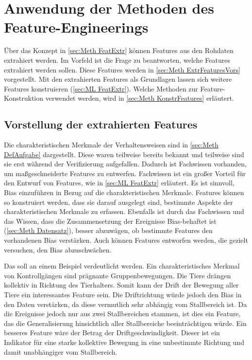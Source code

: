 \section{Anwendung der Methoden des Feature-Engineerings}
Über das Konzept in \autoref{sec:Meth FeatExtr} können Features aus den Rohdaten extrahiert werden. Im Vorfeld ist die Frage zu beantworten, welche Features extrahiert werden sollen. Diese Features werden in \autoref{sec:Meth ExtrFeaturesVors} vorgestellt. Mit den extrahierten Features als Grundlagen lassen sich weitere Features konstruieren (\autoref{sec:ML FeatExtr}). Welche Methoden zur Feature-Konstruktion verwendet werden, wird in \autoref{sec:Meth KonstrFeatures} erläutert.


\subsection{Vorstellung der extrahierten Features} \label{sec:Meth ExtrFeaturesVors}
Die charakteristischen Merkmale der Verhaltensweisen sind in \autoref{sec:Meth DefAufgabe} dargestellt. Diese waren teilweise bereits bekannt und teilweise sind sie erst während der Verifizierung aufgefallen. Dadurch ist Fachwissen vorhanden, um maßgeschneiderte Features zu entwerfen. Fachwissen ist ein großer Vorteil für den Entwurf von Features, wie in \autoref{sec:ML FeatExtr} erläutert. Es ist sinnvoll, Bias einzuführen in Bezug auf die charakteristischen Merkmale. Features können so konstruiert werden, dass sie darauf ausgelegt sind, bestimmte Aspekte der charakteristischen Merkmale zu erfassen. Ebenfalls ist durch das Fachwissen und das Wissen, dass die Zusammensetzung der Ereignisse Bias-behaftet ist (\autoref{sec:Meth Datensatz}), besser abzuwägen, ob bestimmte Features den vorhandenen Bias verstärken. Auch können Features entworfen werden, die gezielt versuchen, den Bias abzuschwächen. \par

Das soll an einem Beispiel verdeutlicht werden. Ein charakteristisches Merkmal von Kontrollgängen sind prägnante Gruppenbewegungen. Die Tiere drängen kollektiv in Richtung des Tierhalters. Somit kann der Drift der Bewegung aller Tiere ein interessantes Feature sein. Die Driftrichtung würde jedoch den Bias in den Daten verstärken, da diese vermutlich sehr abhängig vom Stallbereich ist. Da die Ereignisse jedoch nur aus zwei Stallbereichen stammen, ist dies ein Feature, das die Generalisierung hinsichtlich aller Stallbereiche beeinträchtigen würde. Ein besseres Feature wäre der Betrag der Driftgeschwindigkeit. Dieser ist ein Indikator für eine starke kollektive Bewegung in eine unbestimmte Richtung und damit unabhängiger vom Stallbereich. \par 

